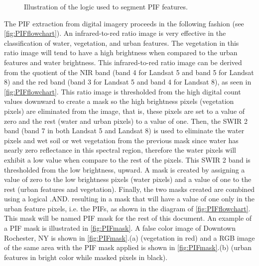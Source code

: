 \documentclass[]{spie}  %
\begin{document}
\begin{figure}[htb]
{
  }%
\caption{Illustration of the logic used to segment PIF features. \label{fig:PIFflowchart}}
\end{figure}

The PIF extraction from digital imagery proceeds in the following fashion (see \autoref{fig:PIFflowchart}). An infrared-to-red ratio image is very effective in the classification of water, vegetation, and urban features. The vegetation in this ratio image will tend to have a high brightness when compared to the urban features and water brightness. This infrared-to-red ratio image can be derived from the quotient of the NIR band (band 4 for Landsat 5 and band 5 for Landsat 8) and the red band (band 3 for Landsat 5 and band 4 for Landsat 8), as seen in \autoref{fig:PIFflowchart}. This ratio image is thresholded from the high digital count values downward to create a mask so the high brightness pixels (vegetation pixels) are eliminated  from the image, that is, these pixels are set to a value of zero and the rest (water and urban pixels) to a value of one. Then, the SWIR 2 band (band 7 in both Landsat 5 and Landsat 8) is used to eliminate the water pixels and wet soil or wet vegetation from the previous mask since water has nearly zero reflectance in this spectral region, therefore the water pixels will exhibit a low value when compare to the rest of the pixels. This SWIR 2 band is thresholded from the low brightness, upward. A mask is created by assigning a value of zero to the low brightness pixels (water pixels) and a value of one to the rest (urban features and vegetation). Finally, the two masks created are combined using a logical .AND. resulting in a mask that will have a value of one only in the urban feature pixels, i.e. the PIFs, as shown in the diagram of \autoref{fig:PIFflowchart}. This mask will be named PIF mask for the rest of this document. An example of a PIF mask is illustrated in \autoref{fig:PIFmask}. A false color image of Downtown Rochester, NY is shown in \autoref{fig:PIFmask}.(a) (vegetation in red) and a RGB image of the same area with the PIF mask applied is shown in \autoref{fig:PIFmask}.(b) (urban features in bright color while masked pixels in black). 
\end{document}
